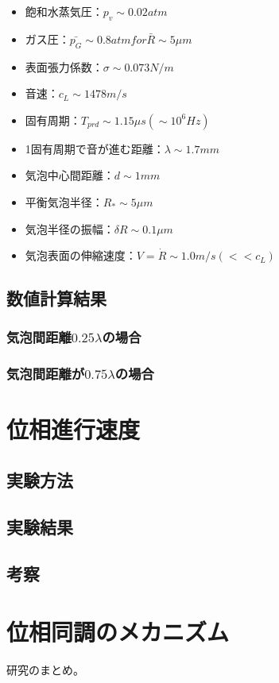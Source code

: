 \documentclass[11pt,a4j]{jreport}
\begin{document}
\begin{itemize}
  \item 飽和水蒸気圧：$p_{v} \sim 0.02atm$
  \item ガス圧：$\bar{p_{G}} \sim 0.8atm for \bar{R} \sim 5\mu m$
  \item 表面張力係数：$\sigma \sim 0.073N/m$
  \item 音速：$c_{L} \sim 1478m/s$
  \item 固有周期：$T_{prd} \sim 1.15\mu s(\sim 10^6Hz)$
  \item 1固有周期で音が進む距離：$\lambda \sim 1.7mm$
  \item 気泡中心間距離：$d \sim 1mm$
  \item 平衡気泡半径：$R_{*} \sim 5\mu m$
  \item 気泡半径の振幅：$\delta R \sim 0.1\mu m$
  \item 気泡表面の伸縮速度：$V=\dot{R} \sim 1.0m/s(<<c_{L})$
\end{itemize}
%
\section{数値計算結果}
\subsection{気泡間距離$0.25\lambda$の場合}
\subsection{気泡間距離が$0.75\lambda$の場合}

\chapter{位相進行速度}
\section{実験方法}
\section{実験結果}
\section{考察}

\chapter{位相同調のメカニズム}
研究のまとめ。
\end{document}
